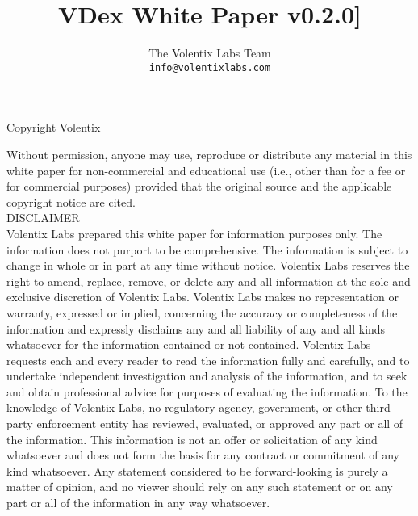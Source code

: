 \documentclass[]{article}
\title{VDex White Paper v0.2.0]}
\author{
		The Volentix Labs Team\\
	\texttt{info@volentixlabs.com}
}
\begin{document}
\tableofcontents
\maketitle
\begin{description}
\item Copyright  Volentix
\end{description}

{\tiny Without permission, anyone may use, reproduce or distribute any material in this white paper for non-commercial and educational use (i.e., other than for a fee or for commercial purposes) provided that the original source and the applicable copyright notice are cited.\\

DISCLAIMER \\

Volentix Labs prepared this white paper for information purposes only. The information does not purport to be comprehensive. The information is subject to change in whole or in part at any time without notice. Volentix Labs reserves the right to amend, replace, remove, or delete any and all information at the sole and exclusive discretion of Volentix Labs. Volentix Labs makes no representation or warranty, expressed or implied, concerning the accuracy or completeness of the information and expressly disclaims any and all liability of any and all kinds whatsoever for the information contained or not contained. Volentix Labs requests each and every reader to read the information fully and carefully, and to undertake independent investigation and analysis of the information, and to seek and obtain professional advice for purposes of evaluating the information. To the knowledge of Volentix Labs, no regulatory agency, government, or other third-party enforcement entity has reviewed, evaluated, or approved any part or all of the information. This information is not an offer or solicitation of any kind whatsoever and does not form the basis for any contract or commitment of any kind whatsoever. Any statement considered to be forward-looking is purely a matter of opinion, and no viewer should rely on any such statement or on any part or all of the information in any way whatsoever.

}
\end{document}
